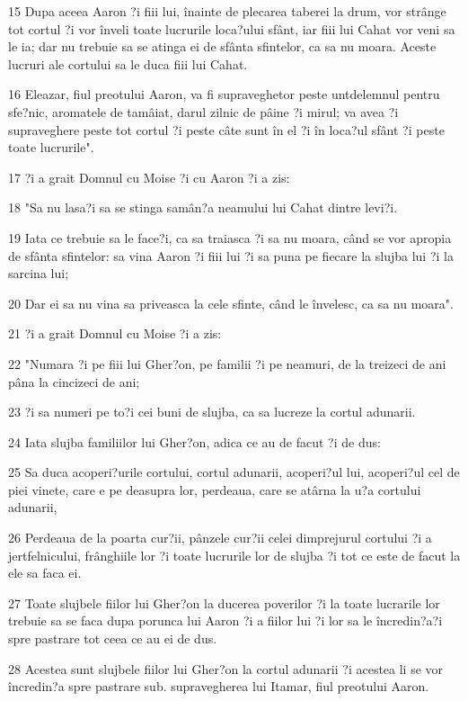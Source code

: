 \par 15 Dupa aceea Aaron ?i fiii lui, înainte de plecarea taberei la drum, vor strânge tot cortul ?i vor înveli toate lucrurile loca?ului sfânt, iar fiii lui Cahat vor veni sa le ia; dar nu trebuie sa se atinga ei de sfânta sfintelor, ca sa nu moara. Aceste lucruri ale cortului sa le duca fiii lui Cahat.
\par 16 Eleazar, fiul preotului Aaron, va fi supraveghetor peste untdelemnul pentru sfe?nic, aromatele de tamâiat, darul zilnic de pâine ?i mirul; va avea ?i supraveghere peste tot cortul ?i peste câte sunt în el ?i în loca?ul sfânt ?i peste toate lucrurile".
\par 17 ?i a grait Domnul cu Moise ?i cu Aaron ?i a zis:
\par 18 "Sa nu lasa?i sa se stinga samân?a neamului lui Cahat dintre levi?i.
\par 19 Iata ce trebuie sa le face?i, ca sa traiasca ?i sa nu moara, când se vor apropia de sfânta sfintelor: sa vina Aaron ?i fiii lui ?i sa puna pe fiecare la slujba lui ?i la sarcina lui;
\par 20 Dar ei sa nu vina sa priveasca la cele sfinte, când le învelesc, ca sa nu moara".
\par 21 ?i a grait Domnul cu Moise ?i a zis:
\par 22 "Numara ?i pe fiii lui Gher?on, pe familii ?i pe neamuri, de la treizeci de ani pâna la cincizeci de ani;
\par 23 ?i sa numeri pe to?i cei buni de slujba, ca sa lucreze la cortul adunarii.
\par 24 Iata slujba familiilor lui Gher?on, adica ce au de facut ?i de dus:
\par 25 Sa duca acoperi?urile cortului, cortul adunarii, acoperi?ul lui, acoperi?ul cel de piei vinete, care e pe deasupra lor, perdeaua, care se atârna la u?a cortului adunarii,
\par 26 Perdeaua de la poarta cur?ii, pânzele cur?ii celei dimprejurul cortului ?i a jertfelnicului, frânghiile lor ?i toate lucrurile lor de slujba ?i tot ce este de facut la ele sa faca ei.
\par 27 Toate slujbele fiilor lui Gher?on la ducerea poverilor ?i la toate lucrarile lor trebuie sa se faca dupa porunca lui Aaron ?i a fiilor lui ?i lor sa le încredin?a?i spre pastrare tot ceea ce au ei de dus.
\par 28 Acestea sunt slujbele fiilor lui Gher?on la cortul adunarii ?i acestea li se vor încredin?a spre pastrare sub. supravegherea lui Itamar, fiul preotului Aaron.
